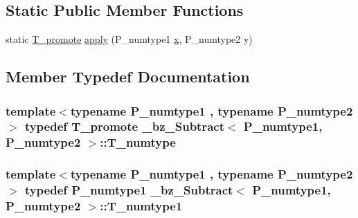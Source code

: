 \subsection*{Static Public Member Functions}
\begin{DoxyCompactItemize}
\item 
static \hyperlink{minmax_8h_aaa88a440c2f0d00798d5b1d42c79308d}{T\+\_\+promote} \hyperlink{class__bz__Subtract_a81fadf9abfd5e22e465fd5472e98a993}{apply} (P\+\_\+numtype1 \hyperlink{vecnorm1_8cc_ac73eed9e41ec09d58f112f06c2d6cb63}{x}, P\+\_\+numtype2 y)
\end{DoxyCompactItemize}


\subsection{Member Typedef Documentation}
\hypertarget{class__bz__Subtract_a8116c56e0ad2b52437a3197d303edd61}{}
\subsubsection[{T\+\_\+numtype}]{\setlength{\rightskip}{0pt plus 5cm}template$<$typename P\+\_\+numtype1 , typename P\+\_\+numtype2 $>$ typedef {\bf T\+\_\+promote} {\bf \+\_\+bz\+\_\+\+Subtract}$<$ P\+\_\+numtype1, P\+\_\+numtype2 $>$\+::{\bf T\+\_\+numtype}}\label{class__bz__Subtract_a8116c56e0ad2b52437a3197d303edd61}
\hypertarget{class__bz__Subtract_aeb106df778e99c217986b680efbf69ff}{}
\subsubsection[{T\+\_\+numtype1}]{\setlength{\rightskip}{0pt plus 5cm}template$<$typename P\+\_\+numtype1 , typename P\+\_\+numtype2 $>$ typedef P\+\_\+numtype1 {\bf \+\_\+bz\+\_\+\+Subtract}$<$ P\+\_\+numtype1, P\+\_\+numtype2 $>$\+::{\bf T\+\_\+numtype1}}\label{class__bz__Subtract_aeb106df778e99c217986b680efbf69ff}
\hypertarget{class__bz__Subtract_a4678d506752d16677b34c2d296343a7e}{}
